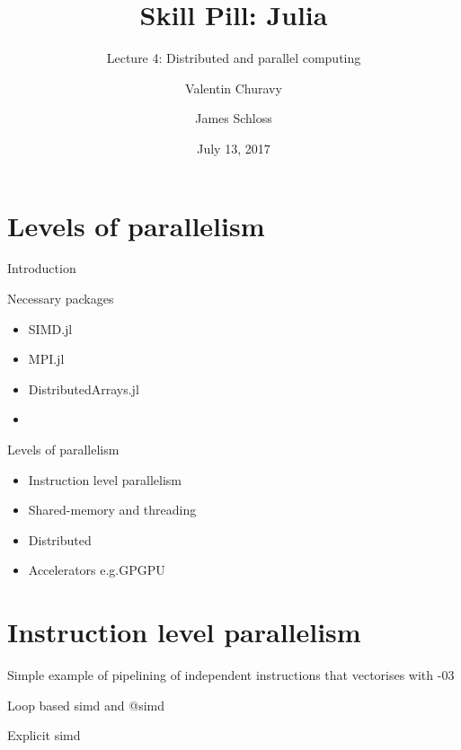 \documentclass{beamer}
\title[Skill Pill]{Skill Pill: Julia} %
\subtitle{Lecture 4: Distributed and parallel computing}
\author{Valentin Churavy \and James Schloss} %
\institute[OIST] %
{
Okinawa Institute of Science and Technology \\ %
\textit{valentin.churavy@oist.jp} \\
\textit{james.schloss@oist.jp} %
}
\date{July 13, 2017} %
\begin{document}

\begin{frame}
\vspace*{1.4cm}
\titlepage %
\end{frame}



\begin{frame}
  \tableofcontents
\end{frame}

\section{Levels of parallelism}
\begin{frame}{Introduction}
  \pause
  \begin{block}{Necessary packages}
    \begin{itemize}
      \item SIMD.jl
      \item MPI.jl
      \item DistributedArrays.jl
      \item 
    \end{itemize}
  \end{block}
\end{frame}
\begin{frame}{Levels of parallelism}
  \begin{itemize}
    \item Instruction level parallelism
    \item Shared-memory and threading
    \item Distributed
    \item Accelerators e.g.GPGPU
  \end{itemize}
\end{frame}

\section{Instruction level parallelism}
\begin{frame}
  Simple example of pipelining of independent instructions that vectorises with -03
\end{frame}
\begin{frame}
  Loop based simd and @simd
\end{frame}
\begin{frame}{}
  Explicit simd
\end{frame}
\end{document}
